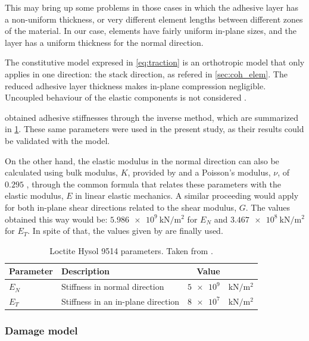 \documentclass[cmfonts]{witpress}
\begin{document}
This may bring up some problems in those cases in which the adhesive layer has a non-uniform thickness, or very different element lengths between different zones of the material. In our case, elements have fairly uniform in-plane sizes, and the layer has a uniform thickness for the normal direction.

The constitutive model expresed in \cref{eq:traction} is an orthotropic model that only applies in one direction: the stack direction, as refered in \cref{sec:coh_elem}. The reduced adhesive layer thickness makes in-plane compression negligible. Uncoupled behaviour of the elastic components is not considered \cite{Scattina2011}.

\cite{Scattina2011} obtained adhesive stiffnesses through the inverse method, which are summarized in \cref{tab:ads_params}. These same parameters were used in the present study, as their results could be validated with the model.

On the other hand, the elastic modulus in the normal direction can also be calculated using bulk modulus, $K$, provided by \cite{manufCatalog} and a Poisson's modulus, $\nu$, of $\num{0.295}$ \cite{JDiaz}, through the common formula that relates these parameters with the elastic modulus, $E$ in linear elastic mechanics. A similar proceeding would apply for both in-plane shear directions related to the shear modulus, $G$. The values obtained this way would be: $\SI{5.986e9}{\kN/\m^2}$ for $E_{N}$ and $\SI{3.467e8}{\kN/\m^2}$ for $E_{T}$. In spite of that, the values given by \cite{Scattina2011} are finally used.

\begin{table}
	\centering
	\begin{tabular}{llrl}
		\toprule
		Parameter & Description & Value & \\
		\midrule
		$E_{N}$ & Stiffness in normal direction & $\num{5e9}$ & $\si{\kN/\m^2}$ \\
		$E_{T}$ & Stiffness in an in-plane direction & $\num{8e7}$ & $\si{\kN/\m^2}$ \\
		\bottomrule
	\end{tabular}
	\caption[Loctite Hysol 9514 parameters.]{Loctite Hysol 9514 parameters. Taken from \cite{Scattina2011}.}
	\label{tab:ads_params}
\end{table}

\subsubsection{Damage model}
\label{sec:damage}
\end{document}
